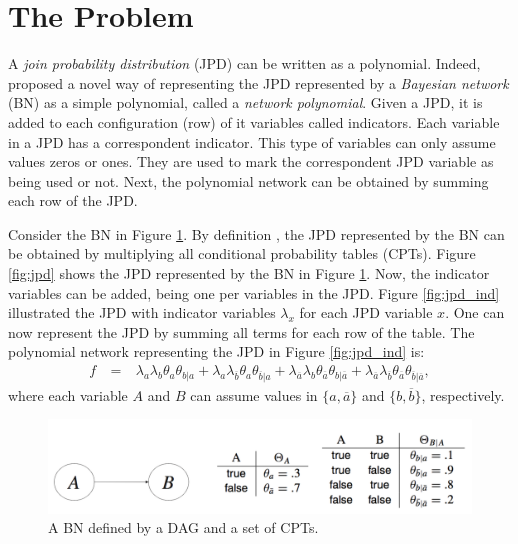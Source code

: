 \section{The Problem}
\label{sec:intro}

A \emph{join probability distribution} (JPD) can be written as a polynomial.
Indeed, \cite{Darwiche2009} proposed a novel way of representing the JPD represented by a \emph{Bayesian network} (BN) as a simple polynomial, called a \emph{network polynomial}.
Given a JPD, it is added to each configuration (row) of it variables called indicators.
Each variable in a JPD has a correspondent indicator.
This type of variables can only assume values zeros or ones.
They are used to mark the correspondent JPD variable as being used or not.
Next, the polynomial network can be obtained by summing each row of the JPD.


\begin{example}
Consider the BN in Figure \ref{fig:bn}.
By definition \citep{Koller:2009wk}, the JPD represented by the BN can be obtained by multiplying all conditional probability tables (CPTs).
Figure \ref{fig:jpd} shows the JPD represented by the BN in Figure \ref{fig:bn}.
Now, the indicator variables can be added, being one per variables in the JPD.
Figure \ref{fig:jpd_ind} illustrated the JPD with indicator variables $\lambda_x$ for each JPD variable $x$.
One can now represent the JPD by summing all terms for each row of the table.
The polynomial network representing the JPD in Figure \ref{fig:jpd_ind} is:
\begin{eqnarray}
    f ~&=&~ \lambda_a \lambda_b \theta_a \theta_{b|a}
    + \lambda_a \lambda_{\overline{b}} \theta_a \theta_{\overline{b}|a}
    + \lambda_{\overline{a}} \lambda_b \theta_{\overline{a}} \theta_{b|\overline{a}}
    + \lambda_{\overline{a}} \lambda_{\overline{b}} \theta_{\overline{a}} \theta_{\overline{b}|\overline{a}}, \label{eq:np}
\end{eqnarray}
where each variable $A$ and $B$ can assume values in $\{a, \overline{a}\}$ and $\{b, \overline{b}\}$, respectively.
\end{example}

\begin{figure}[hbt]
    \begin{center}
    \includegraphics[width=\textwidth]{figures/bn.png}
    \caption{A BN defined by a DAG and a set of CPTs.}
    \label{fig:bn}
    \end{center}
\end{figure}

